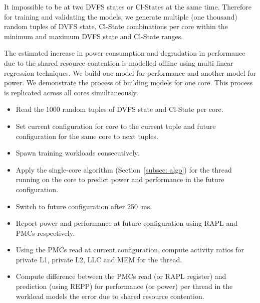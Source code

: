  It impossible to be at two DVFS states or Cl-States at the same time.
Therefore for training and validating the models, we generate multiple (one thousand)
random tuples of DVFS state, Cl-State combinations per core within the minimum and maximum
DVFS state and Cl-State ranges.

The estimated increase in power consumption and degradation in performance due to the
shared resource contention is modelled offline using multi linear regression techniques.
We build one model for performance and another model for power. We demonstrate the process
of building models for one core. This process is replicated across all cores
simultaneously. 

\begin{itemize}

    \item[{\small \circled{1}}] Read the 1000 random tuples of DVFS state and Cl-State per
        core.

    \item[{\small \circled{2}}] Set current configuration for core to the current tuple
        and future configuration for the same core to next tuples.

\item[{\small\circled{3}}] Spawn training workloads consecutively.

\item[{\small\circled{4}}] Apply the single-core algorithm (Section~\ref{subsec: algo})
    for the thread running on the core to predict power and performance in the future
        configuration.

\item[{\small\circled{5}}] Switch to future configuration after \SI{250}{\milli\second}.

\item[{\small\circled{6}}] Report power and performance at future configuration using RAPL
    and PMCs respectively. 

\item[{\small\circled{7}}] Using the PMCs read at current configuration, compute activity
    ratios for private L1, private L2, LLC and MEM for the thread.

\item[{\small\circled{8}}] Compute difference between the PMCs read (or RAPL register) and
    prediction (using REPP) for performance (or power) per thread in the workload models
        the error due to shared resource contention.  

\end{itemize}


